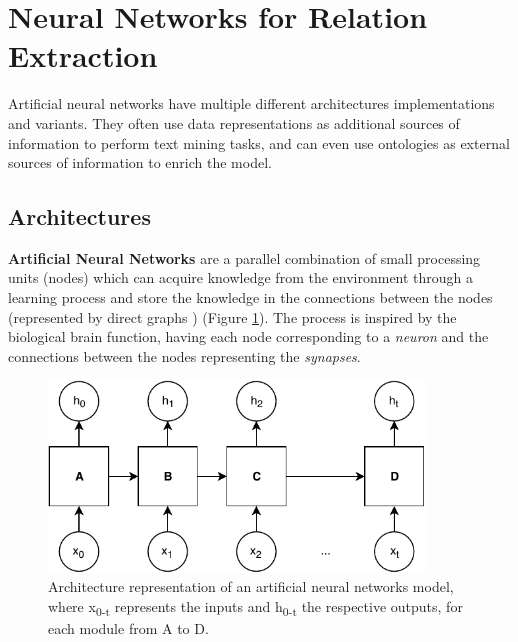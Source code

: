 
\hypertarget{2.5}{\section{Neural Networks for Relation Extraction}}

Artificial neural networks have multiple different architectures implementations and variants. They often use data representations as additional sources of information to perform text mining tasks, and can even use ontologies as external sources of information to enrich the model.


\subsection{Architectures}

\textbf{Artificial Neural Networks} are a parallel combination of small processing units (nodes) which can acquire knowledge from the environment through a learning process and store the knowledge in the connections between the nodes \citep{Haykin:1998:NNC:521706} (represented by direct graphs \citep{GURESEN2011426}) (Figure \ref{figure:3}). The process is inspired by the biological brain function, having each node corresponding to a \textit{neuron} and the connections between the nodes representing the \textit{synapses}.

\begin{figure}[hbt!]
\captionsetup{font=small}
\centering
\includegraphics[width=10cm]{images/figure_3.pdf}
\fontsize{9}{10.8}\caption[Artificial Neural Networks Architecture]{Architecture representation of an artificial neural networks model, where x\textsubscript{0-t} represents the inputs and h\textsubscript{0-t} the respective outputs, for each module from A to D.}
\label{figure:3}
\end{figure}

